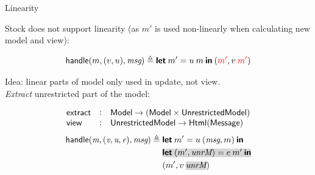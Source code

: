 \documentclass[11.5pt, aspectratio=169]{beamer}
\begin{document}
\begin{frame}{Linearity}

  \begin{fullpageitemize}
  \item Stock \mvu does not support linearity (as $m'$ is used non-linearly when calculating new model and view):
  \end{fullpageitemize}
  \[
    \mathsf{handle}(m, (v, u), \textit{msg}) \triangleq \textbf{\textsf{let}} \: m' = u \: m \: \textbf{\textsf{in}} \: ({\color{red}{m'}}, v \: {\color{red}{m'}})
  \]%
  \vspace{0.25em}
  \begin{fullpageitemize}
  \itemR Idea: linear parts of model only used in update, not view. \\
    \emph{Extract} unrestricted part of the model:
  \end{fullpageitemize}
  \begin{mybox}
  \[
    \begin{array}{lcl}
      \mathsf{extract} & : & \mathsf{Model} \to (\mathsf{Model} \times \mathsf{UnrestrictedModel}) \\
      \mathsf{view}    & : & \mathsf{UnrestrictedModel} \to \mathsf{Html}(\mathsf{Message}) \\
    \end{array}
  \]
\[
\begin{array}{l}
  \handle{\textit{m}, (\textit{v}, \textit{u}, \textit{e}), \textit{msg}}
  \defeq
    \begin{aligned}[t]
      & \letintwo{m'}{u \app (\textit{msg}, m)} \\
      & \shade{\letintwo{(m', \textit{unrM})}{e \app m'}} \\
      & {(m', v \app \shade{\textit{unrM}})}
    \end{aligned}
  \end{array}
\]
\end{mybox}

\end{frame}

\end{document}
